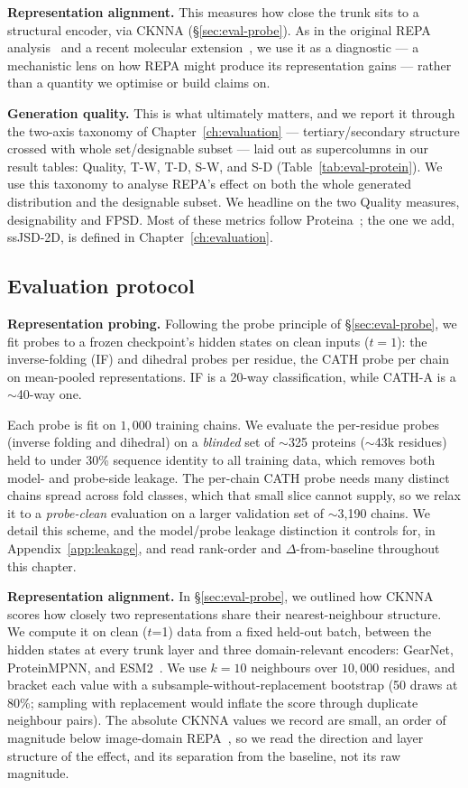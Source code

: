 \documentclass[12pt,a4paper,twoside]{report}
\begin{document}
\textbf{Representation alignment.} This measures how close the trunk sits to a structural encoder, via CKNNA (\S\ref{sec:eval-probe}). As in the original REPA analysis~\cite{REPA} and a recent molecular extension~\cite{BoltzREPA}, we use it as a diagnostic --- a mechanistic lens on how REPA might produce its representation gains --- rather than a quantity we optimise or build claims on.

\textbf{Generation quality.} This is what ultimately matters, and we report it through the two-axis taxonomy of Chapter~\ref{ch:evaluation} --- tertiary/secondary structure crossed with whole set/designable subset --- laid out as supercolumns in our result tables: Quality, T-W, T-D, S-W, and S-D (Table~\ref{tab:eval-protein}). We use this taxonomy to analyse REPA's effect on both the whole generated distribution and the designable subset. We headline on the two Quality measures, designability and FPSD. Most of these metrics follow Proteina~\cite{Proteina}; the one we add, ssJSD-2D, is defined in Chapter~\ref{ch:evaluation}.

\subsection{Evaluation protocol}
\label{sec:eval-protocol}

\textbf{Representation probing.} Following the probe principle of \S\ref{sec:eval-probe}, we fit probes to a frozen checkpoint's hidden states on clean inputs ($t{=}1$): the inverse-folding (IF) and dihedral probes per residue, the CATH probe per chain on mean-pooled representations. IF is a 20-way classification, while CATH-A is a $\sim$40-way one.

Each probe is fit on $1{,}000$ training chains. We evaluate the per-residue probes (inverse folding and dihedral) on a \emph{blinded} set of $\sim$325 proteins ($\sim$43k residues) held to under 30\% sequence identity to all training data, which removes both model- and probe-side leakage. The per-chain CATH probe needs many distinct chains spread across fold classes, which that small slice cannot supply, so we relax it to a \emph{probe-clean} evaluation on a larger validation set of $\sim$3{,}190 chains. We detail this scheme, and the model/probe leakage distinction it controls for, in Appendix~\ref{app:leakage}, and read rank-order and $\Delta$-from-baseline throughout this chapter.

\textbf{Representation alignment.} In \S\ref{sec:eval-probe}, we outlined how CKNNA scores how closely two representations share their nearest-neighbour structure. We compute it on clean ($t$=1) data from a fixed held-out batch, between the hidden states at every trunk layer and three domain-relevant encoders: GearNet, ProteinMPNN, and ESM2~\cite{ESM2}. We use $k{=}10$ neighbours over $10{,}000$ residues, and bracket each value with a subsample-without-replacement bootstrap (50 draws at 80\%; sampling with replacement would inflate the score through duplicate neighbour pairs). The absolute CKNNA values we record are small, an order of magnitude below image-domain REPA~\cite{REPA}, so we read the direction and layer structure of the effect, and its separation from the baseline, not its raw magnitude.
\end{document}
